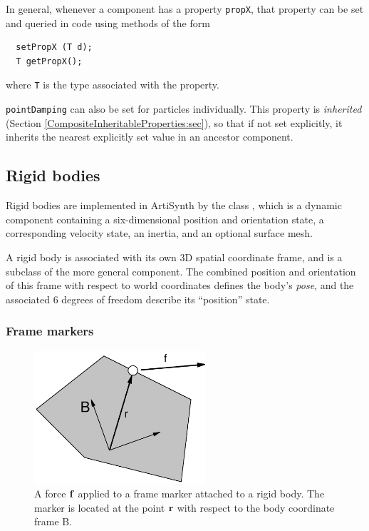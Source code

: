 \begin{sideblock}
In general, whenever a component has a property {\tt propX}, that
property can be set and queried in code using methods of the form
\begin{verbatim}
  setPropX (T d);
  T getPropX();
\end{verbatim}
where {\tt T} is the type associated with the property.
\end{sideblock}

{\tt pointDamping} can also be set for particles individually.  This
property is {\it inherited} (Section
\ref{CompositeInheritableProperties:sec}), so that if not set
explicitly, it inherits the nearest explicitly set value in an
ancestor component.

\subsection{Rigid bodies}

Rigid bodies are implemented in ArtiSynth by the class
, which is a dynamic
component containing a six-dimensional position and orientation state,
a corresponding velocity state, an inertia, and an optional surface
mesh.

A rigid body is associated with its own 3D spatial coordinate frame,
and is a subclass of the more general
 component.
The combined position and orientation of this frame with respect to
world coordinates defines the body's {\it pose}, and the associated 6
degrees of freedom describe its ``position'' state.

\subsubsection{Frame markers}
\label{FrameMarkers:sec}

\begin{figure}[t]
\begin{center}
 \includegraphics[width=2.5in]{images/frameMarker}
\end{center}
\caption{A force ${\bf f}$ applied to a frame marker attached to a rigid
body. The marker is located at the point ${\bf r}$ with respect to the body
coordinate frame B.}
\label{frameMarker:fig}
\end{figure}

